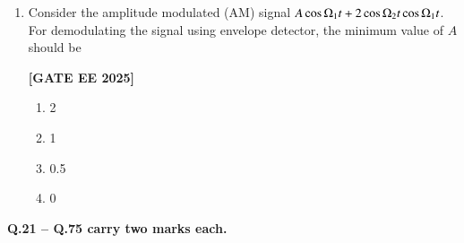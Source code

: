 \documentclass[12pt]{article}
\begin{document}
\begin{enumerate}[leftmargin=2.5em, label=\textbf{Q.\arabic*}., itemsep=2em]
\noindent \textbf{[GATE EE 2025]}
\begin{multicols}{4}
\begin{enumerate}
  \item $\dfrac{K(V_{\mathrm{GS}}-V_T)^2}{V_{\mathrm{DS}}}$
  \item $2K(V_{\mathrm{GS}}-V_T)$
  \item $\dfrac{I_D}{V_{\mathrm{GS}}-V_{\mathrm{DS}}}$
  \item $\dfrac{K(V_{\mathrm{GS}}-V_T)^2}{V_{\mathrm{GS}}}$
\end{enumerate}
\end{multicols}

\item Consider the amplitude modulated (AM) signal $A\cos\ohm_1 t+2\cos\ohm_2 t\cos\ohm_1 t$. For demodulating the signal using envelope detector, the minimum value of $A$ should be
 
\noindent \textbf{[GATE EE 2025]}
\begin{multicols}{4}
\begin{enumerate}
  \item 2
  \item 1
  \item 0.5
  \item 0
\end{enumerate}
\end{multicols}

\end{enumerate}


\large \textbf {Q.21 – Q.75 carry two marks each.}
\end{document}

